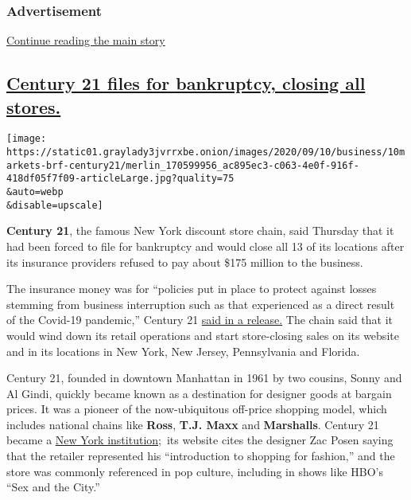 \hypertarget{advertisement-1}{%
\subsubsection{Advertisement}\label{advertisement-1}}

\protect\hyperlink{after-dfp-ad-mid2}{Continue reading the main story}

\hypertarget{century-21-files-for-bankruptcy-closing-all-stores}{%
\subsection{\texorpdfstring{\protect\hyperlink{century-21-files-for-bankruptcy-closing-all-stores}{Century
21 files for bankruptcy, closing all
stores.}}{Century 21 files for bankruptcy, closing all stores.}}\label{century-21-files-for-bankruptcy-closing-all-stores}}

\texttt{[image: https://static01.graylady3jvrrxbe.onion/images/2020/09/10/business/10markets-brf-century21/merlin\_170599956\_ac895ec3-c063-4e0f-916f-418df05f7f09-articleLarge.jpg?quality=75\\\&auto=webp\\\&disable=upscale]}

\textbf{Century 21}, the famous New York discount store chain, said
Thursday that it had been forced to file for bankruptcy and would close
all 13 of its locations after its insurance providers refused to pay
about \$175 million to the business.

The insurance money was for ``policies put in place to protect against
losses stemming from business interruption such as that experienced as a
direct result of the Covid-19 pandemic,'' Century 21
\href{https://www.prnewswire.com/news-releases/century-21-stores-to-commence-wind-down-of-retail-operations-301127393.html}{said
in a release.} The chain said that it would wind down its retail
operations and start store-closing sales on its website and in its
locations in New York, New Jersey, Pennsylvania and Florida.

Century 21, founded in downtown Manhattan in 1961 by two cousins, Sonny
and Al Gindi, quickly became known as a destination for designer goods
at bargain prices. It was a pioneer of the now-ubiquitous off-price
shopping model, which includes national chains like \textbf{Ross},
\textbf{T.J. Maxx} and \textbf{Marshalls}. Century 21 became a
\href{https://www.nytimes3xbfgragh.onion/2017/10/31/style/next-century-21-shopping.html}{New
York institution};~its website cites the designer Zac Posen saying that
the retailer represented his ``introduction to shopping for fashion,''
and the store was commonly referenced in pop culture, including in shows
like HBO's ``Sex and the City.''

